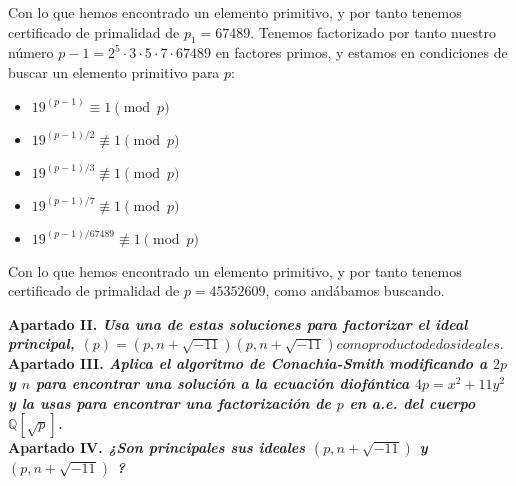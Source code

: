 \documentclass[fleqn]{article}
\def\Q{\mathds{Q}}
\begin{document}
    Con lo que hemos encontrado un elemento primitivo, y por tanto tenemos certificado de primalidad de $p_1 = 67489$.
    Tenemos factorizado por tanto nuestro número $p-1 = 2^5 \cdot 3 \cdot 5 \cdot 7 \cdot 67489$ en factores primos, y estamos en condiciones de buscar un elemento 
    primitivo para $p$:

    \begin{itemize}
        \item $19^{(p - 1)} \equiv 1 \pmod{p}$
        \item $19^{(p - 1)/2} \not\equiv 1 \pmod{p}$    
        \item $19^{(p - 1)/3} \not\equiv 1 \pmod{p}$
        \item $19^{(p - 1)/7} \not\equiv 1 \pmod{p}$
        \item $19^{(p - 1)/67489} \not\equiv 1 \pmod{p}$
    \end{itemize}

    Con lo que hemos encontrado un elemento primitivo, y por tanto tenemos certificado de primalidad de $p = 45352609$, como andábamos buscando.
    





    \newpage
    \textbf{Apartado II. \textit{Usa una de estas soluciones para factorizar el ideal principal, 
                                $(p) = (p, n+ \sqrt{-11})(p, n+ \sqrt{-11}) como producto de dos ideales.$}}\\

    \newpage
    \textbf{Apartado III. \textit{Aplica el algoritmo de Conachia-Smith modificando a $2p$ y $n$ para encontrar
                                una solución a la ecuación diofántica $4p = x^2 + 11y^2 $ y la usas para encontrar 
                                una factorización de $p$ en a.e. del cuerpo $\Q[\sqrt{p}]$.}} \\


    \newpage
    \textbf{Apartado IV. \textit{¿Son principales sus ideales $(p, n+ \sqrt{-11})$ y $(p, n+ \sqrt{-11})$ ?}}\\
\end{document}

